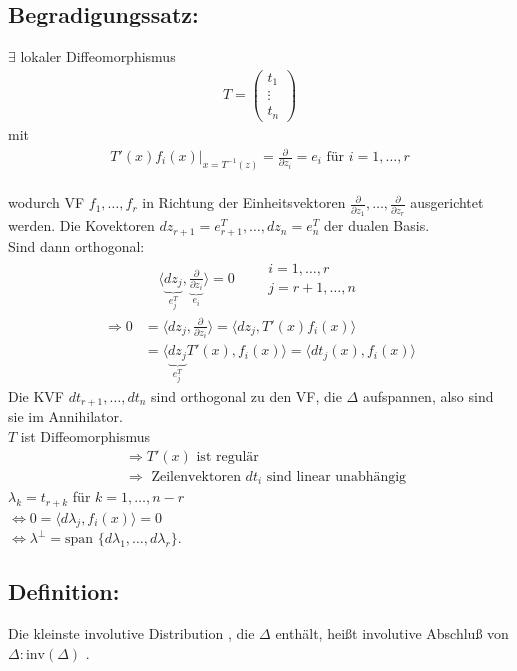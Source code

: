 \documentclass[ngerman]{tudscrreprt}
\begin{document}
\subsection*{Begradigungssatz:} $\exists$ lokaler Diffeomorphismus \begin{align*} T = \begin{pmatrix} t_1 \\ \vdots\\ t_n \end{pmatrix} \end{align*} mit 
\begin{align*} T'(x) f_i(x)|_{x = T^{-1}(z)} = \frac{\partial}{\partial z_i} = e_i \text{ für } i= 1,\dots,r\end{align*}  \\ wodurch VF $f_1,\dots, f_r$ in Richtung der Einheitsvektoren $\frac{\partial}{\partial z_1} ,\dots,\frac{\partial}{\partial z_r}  $ ausgerichtet werden.
Die Kovektoren $d z_{r+1} = e_{r+1}^T ,\dots, d z_{n} = e_{n}^T$ der dualen Basis. \\ Sind dann orthogonal: \begin{align*} \langle \underbrace{d z_j}_{e_j^T}, \underbrace{\frac{\partial}{\partial z_i}}_{e_i} \rangle = 0 \qquad \substack{i = 1, \dots, r\\ j = r+1, \dots, n} \end{align*}
\begin{align*}
\Rightarrow 0 &= \langle d z_j, \frac{\partial}{\partial z_i} \rangle = \langle d z_j , T'(x) f_i(x) \rangle \\ 
&= \langle \underbrace{dz_j}_{e_j^T} T'(x), f_i(x) \rangle = \langle d t_j (x), f_i(x) \rangle
\end{align*}
Die KVF $dt_{r+1}, \dots, dt_n$ sind orthogonal zu den VF, die $\Delta$ aufspannen, also sind sie im Annihilator. \\ 
$T$ ist Diffeomorphismus \begin{align*}&\Rightarrow T'(x) \text{ ist regulär} \\ &\Rightarrow \text{ Zeilenvektoren } dt_i \text{ sind linear unabhängig} \end{align*}  
$\lambda_k = t_{r+k} $ für $k= 1, \dots, n-r$\\ 
$\iff 0 = \langle d \lambda_j, f_i(x) \rangle = 0$\\ 
$\iff \lambda^{\perp} = \text{span }\{ d\lambda_1,\dots,d\lambda_r \}.$
\subsection*{Definition:} Die kleinste involutive Distribution , die $\Delta$ enthält, heißt involutive Abschluß von $\Delta : \text{inv} (\Delta)$ .
\end{document}
